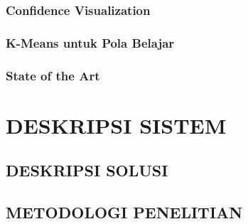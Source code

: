 \documentclass[12pt,a4paper,oneside,openany]{report}
\begin{document}
\subsection{Confidence Visualization}
\label{subsec:penelitian-3}

\subsection{K-Means untuk Pola Belajar}
\label{subsec:penelitian-4}

\subsection{State of the Art}
\label{subsec:state-of-the-art}

\chapter{DESKRIPSI SISTEM}
\label{chap:bab3}


\section{DESKRIPSI SOLUSI}
\label{sec:deskripsi-solusi}

\section{METODOLOGI PENELITIAN}
\label{sec:metodologi-penelitian}
\end{document}
